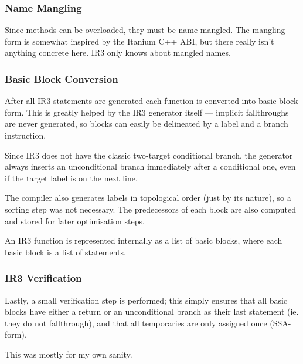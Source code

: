 \documentclass[12pt]{article}
\begin{document}
\subsubsection{Name Mangling}

Since methods can be overloaded, they must be name-mangled. The mangling form is somewhat inspired by the Itanium C++ ABI,
but there really isn't anything concrete here. IR3 only knows about mangled names.




\subsubsection{Basic Block Conversion}

After all IR3 statements are generated each function is converted into basic block form. This is greatly helped by
the IR3 generator itself --- implicit fallthroughs are never generated, so blocks can easily be delineated by
a label and a branch instruction.

Since IR3 does not have the classic two-target conditional branch, the generator always inserts an unconditional
branch immediately after a conditional one, even if the target label is on the next line.

The compiler also generates labels in topological order (just by its nature), so a sorting step was not necessary. The
predecessors of each block are also computed and stored for later optimisation steps.

An IR3 function is represented internally as a list of basic blocks, where each basic block is a list of statements.


\subsubsection{IR3 Verification}

Lastly, a small verification step is performed; this simply ensures that all basic blocks have either a return or
an unconditional branch as their last statement (ie. they do not fallthrough), and that all temporaries are only
assigned once (SSA-form).

This was mostly for my own sanity.

\end{document}
